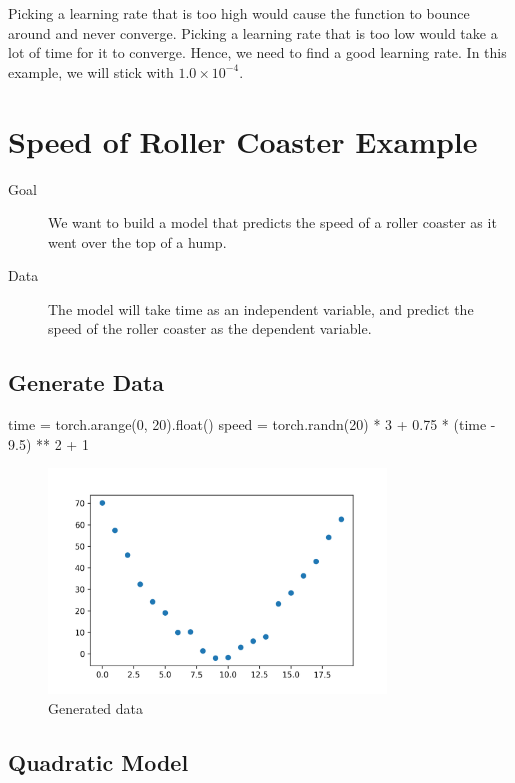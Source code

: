 \documentclass{article}
\newenvironment{monos}{\VerbatimEnvironment\begin{pythoncode}}{\end{pythoncode}}
\begin{document}
Picking a learning rate that is too high would cause the function to bounce around and
never converge. Picking a learning rate that is too low would take a lot of time for it
to converge. Hence, we need to find a good learning rate. In this example, we will
stick with $1.0\times 10^{-4}$.

\section{Speed of Roller Coaster Example}

\begin{description}
    \item[Goal] We want to build a model that predicts the speed of a roller coaster as it went
        over the top of a hump.
    \item[Data] The model will take time as an independent variable, and predict the speed
        of the roller coaster as the dependent variable.
\end{description}

\subsection{Generate Data}

\begin{monos}
    time = torch.arange(0, 20).float()
    speed = torch.randn(20) * 3 + 0.75 * (time - 9.5) ** 2 + 1
\end{monos}

\begin{figure}[H]
    \centering
    \includegraphics[width=0.8\textwidth]{assets/generated_data.png}
    \caption{Generated data}
\end{figure}

\subsection{Quadratic Model}
\end{document}
